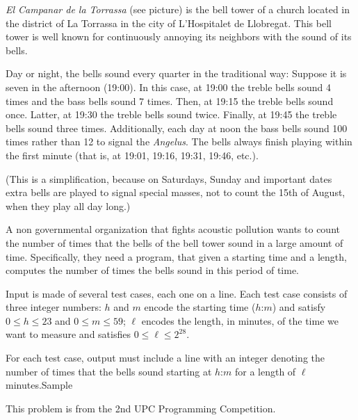 

\Statement


\emph{El Campanar de la Torrassa} (see picture) is the bell tower of a church
located in the district of La Torrassa in the city of L'Hospitalet de
Llobregat. This bell tower is well known for continuously annoying its
neighbors with the sound of its bells.

Day or night, the bells sound every quarter in the traditional way: Suppose it
is seven in the afternoon (19:00). In this case, at 19:00 the treble bells
sound 4 times and the bass bells sound 7 times. Then, at 19:15 the treble
bells sound once. Latter, at 19:30 the treble bells sound twice. Finally, at
19:45 the treble bells sound three times.  Additionally, each day at noon the
bass bells sound 100 times rather than 12 to signal the \emph{Angelus}. The
bells always finish playing within the first minute (that is, at 19:01, 19:16,
19:31, 19:46, etc.).

\medskip

(This is a simplification, because on Saturdays, Sunday and important dates
extra bells are played to signal special masses, not to count the 15th of
August, when they play all day long.)

\medskip

A non governmental organization that fights acoustic pollution wants to count
the number of times that the bells of the bell tower sound in a large amount of
time. Specifically, they need a program, that given a starting time and a
length, computes the number of times the bells sound in this period of time.

\Input

Input is made of several test cases, each one on a line. Each test case
consists of three integer numbers:
$h$ and $m$ encode the starting
time ($h$:$m$) and satisfy $0\le h\le 23$ and $0\le m\le 59$;
$\ell$ encodes the length, in
minutes, of the time we want to measure and satisfies $0\le\ell\le2^{28}$.

\Output

For each test case, output must include a line with an integer denoting the
number of times that the bells sound starting at $h$:$m$ for a length of $\ell$
minutes.Sample

\Sample

\Observation

This problem is from the 2nd UPC Programming Competition.
